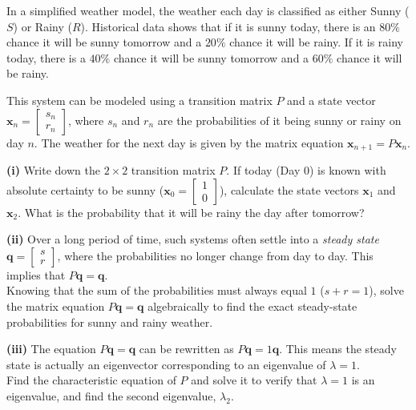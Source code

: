 \begin{problem}
In a simplified weather model, the weather each day is classified as either Sunny ($S$) or Rainy ($R$). 
Historical data shows that if it is sunny today, there is an $80\%$ chance it will be sunny tomorrow and a $20\%$ chance it will be rainy. If it is rainy today, there is a $40\%$ chance it will be sunny tomorrow and a $60\%$ chance it will be rainy.

This system can be modeled using a transition matrix $P$ and a state vector $\mathbf{x}_n = \begin{bmatrix} s_n \\ r_n \end{bmatrix}$, where $s_n$ and $r_n$ are the probabilities of it being sunny or rainy on day $n$. The weather for the next day is given by the matrix equation $\mathbf{x}_{n+1} = P \mathbf{x}_n$.

\textbf{(i)} Write down the $2 \times 2$ transition matrix $P$. If today (Day 0) is known with absolute certainty to be sunny ($\mathbf{x}_0 = \begin{bmatrix} 1 \\ 0 \end{bmatrix}$), calculate the state vectors $\mathbf{x}_1$ and $\mathbf{x}_2$. What is the probability that it will be rainy the day after tomorrow?

\textbf{(ii)} Over a long period of time, such systems often settle into a \textit{steady state} $\mathbf{q} = \begin{bmatrix} s \\ r \end{bmatrix}$, where the probabilities no longer change from day to day. This implies that $P\mathbf{q} = \mathbf{q}$. \\
Knowing that the sum of the probabilities must always equal $1$ ($s + r = 1$), solve the matrix equation $P\mathbf{q} = \mathbf{q}$ algebraically to find the exact steady-state probabilities for sunny and rainy weather.

\textbf{(iii)} The equation $P\mathbf{q} = \mathbf{q}$ can be rewritten as $P\mathbf{q} = 1\mathbf{q}$. This means the steady state is actually an eigenvector corresponding to an eigenvalue of $\lambda = 1$. \\
Find the characteristic equation of $P$ and solve it to verify that $\lambda = 1$ is an eigenvalue, and find the second eigenvalue, $\lambda_2$. 


\end{problem}
